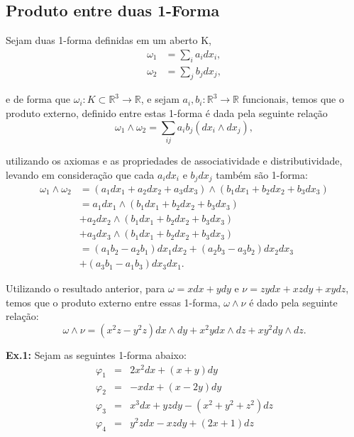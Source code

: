 \subsection{Produto entre duas 1-Forma} 


\hspace{0.5cm}
Sejam duas 1-forma definidas em um aberto K, 
%
\begin{align}
\omega_1 &= \sum_{i}a_{i} dx_i,
\\
\omega_2 &= \sum_{j}b_{j} dx_j,
\end{align}

e de forma que $\omega_i:K\subset\mathbb{R}^3\to\mathbb{R}$, e sejam $a_i,b_i:\mathbb{R}^3\to\mathbb{R}$ funcionais, temos que o produto externo, definido entre estas 1-forma é dada pela seguinte relação
%
\begin{equation}
\omega_1\wedge\omega_2 = \sum_{ij} a_ib_j (dx_i\wedge dx_j),    
\end{equation}

utilizando os axiomas e as propriedades de associatividade e distributividade, levando em consideração que cada $a_i dx_i$ e $b_j dx_j$ também são 1-forma:
%
\begin{align}
\nonumber \omega_1 \wedge \omega_2 &= (a_1 dx_1 + a_2 dx_2 + a_3 dx_3) \wedge(b_1 dx_1 + b_2 dx_2 + b_3 dx_3)
\\
\nonumber &= a_1 dx_1 \wedge(b_1 dx_1 + b_2 dx_2 + b_3 dx_3) 
\\
\nonumber &+ a_2 dx_2 \wedge(b_1 dx_1 + b_2 dx_2 + b_3 dx_3)
\\
\nonumber &+ a_3 dx_3 \wedge(b_1 dx_1 + b_2 dx_2 + b_3 dx_3)
\\
\nonumber &= (a_1b_2 - a_2b_1) dx_1 dx_2 + (a_2b_3 - a_3b_2)dx_2dx_3	
\\
&+ (a_3b_1 - a_1b_3)dx_3dx_1.
\end{align}


Utilizando o resultado anterior, para $\omega = xdx + ydy$ e 
$\nu = zy dx + xzdy + xydz$, temos que o produto externo entre 
essas 1-forma, $\omega\wedge\nu$ é dado pela seguinte relação:
%
\[
\omega\wedge\nu = (x^2z - y^2z)dx \wedge dy + x^2y dx 
\wedge dz + xy^2 dy \wedge dz.
\]




\noindent\textbf{Ex.1:} 
Sejam as seguintes 1-forma abaixo:
%
\begin{eqnarray*}
\varphi_1 &=& 2x^2dx + (x + y)dy                 \\
\varphi_2 &=& - xdx + (x - 2y)dy                 \\
\varphi_3 &=& x^3dx + yzdy - (x^2 + y^2 + z^2)dz \\
\varphi_4 &=& y^2zdx - xzdy + (2x + 1)dz
\end{eqnarray*}

